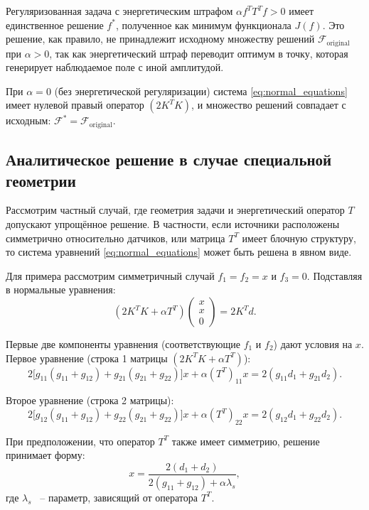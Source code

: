 \documentclass[a4paper,14pt,oneside,openany]{extarticle}
\begin{document}
Регуляризованная задача с энергетическим штрафом $\alpha f^T T^T f > 0$ имеет единственное решение $f^*$, полученное как минимум функционала $J(f)$. 
Это решение, как правило, не принадлежит исходному множеству решений $\mathcal{F}_{\mathrm{original}}$ при $\alpha > 0$, так как энергетический штраф 
переводит оптимум в точку, которая генерирует наблюдаемое поле с иной амплитудой.

При $\alpha = 0$ (без энергетической регуляризации) система \eqref{eq:normal_equations} имеет нулевой правый оператор $(2K^TK)$, и множество решений 
совпадает с исходным: $\mathcal{F}^* = \mathcal{F}_{\mathrm{original}}$.

\subsection{Аналитическое решение в случае специальной геометрии}

Рассмотрим частный случай, где геометрия задачи и энергетический оператор $T$ допускают упрощённое решение. 
В частности, если источники расположены симметрично относительно датчиков, или матрица $T^T$ имеет блочную структуру, то система уравнений \eqref{eq:normal_equations} может быть решена в явном виде.

Для примера рассмотрим симметричный случай $f_1 = f_2 = x$ и $f_3 = 0$. Подставляя в нормальные уравнения:
\begin{equation}
    (2K^TK + \alpha T^T) \begin{pmatrix} x \\ x \\ 0 \end{pmatrix} = 2K^Td.
\end{equation}

Первые две компоненты уравнения (соответствующие $f_1$ и $f_2$) дают условия на $x$. 
Первое уравнение (строка 1 матрицы $(2K^TK + \alpha T^T)$):
\begin{equation}
    2\bigl[g_{11}(g_{11}+g_{12}) + g_{21}(g_{21}+g_{22})\bigr]x + \alpha (T^T)_{11} x = 2(g_{11}d_1 + g_{21}d_2).
\end{equation}

Второе уравнение (строка 2 матрицы):
\begin{equation}
    2\bigl[g_{12}(g_{11}+g_{12}) + g_{22}(g_{21}+g_{22})\bigr]x + \alpha (T^T)_{22} x = 2(g_{12}d_1 + g_{22}d_2).
\end{equation}

При предположении, что оператор $T^T$ также имеет симметрию, решение принимает форму:
\begin{equation}
    x = \frac{2(d_1+d_2)}{2(g_{11}+g_{12}) + \alpha \lambda_s},
\end{equation}
где $\lambda_s$ ~-- параметр, зависящий от оператора $T^T$.
\end{document}
